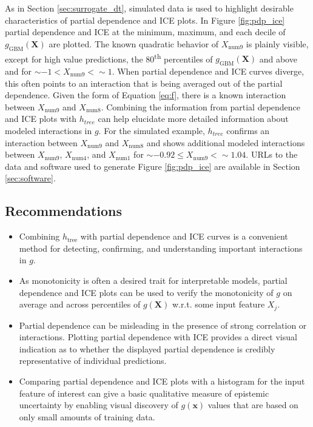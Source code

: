 \documentclass[sigconf, review]{acmart}
\begin{document}
As in Section \ref{sec:surrogate_dt}, simulated data is used to highlight desirable characteristics of partial dependence and ICE plots. In Figure \ref{fig:pdp_ice} partial dependence and ICE at the minimum, maximum, and each decile of $g_{\text{GBM}}(\mathbf{X})$ are plotted. The known quadratic behavior of $X_{\text{num}9}$ is plainly visible, except for high value predictions, the 80\textsuperscript{th} percentiles of $g_{\text{GBM}}(\mathbf{X})$ and above and for $\sim-1 < X_{\text{num}9} < \sim1$. When partial dependence and ICE curves diverge, this often points to an interaction that is being averaged out of the partial dependence. Given the form of Equation \ref{eq:f}, there is a known interaction between $X_{\text{num}9}$ and $X_{\text{num}8}$. Combining the information from partial dependence and ICE plots with $h_{tree}$ can help elucidate more detailed information about modeled interactions in $g$. For the simulated example, $h_{tree}$ confirms an interaction between $X_{\text{num}9}$ and $X_{\text{num}8}$ and shows additional modeled interactions between $X_{\text{num}9}$, $X_{\text{num}4}$, and $X_{\text{num}1}$ for $\sim -0.92 \le X_{\text{num}9} <  \sim 1.04.$ URLs to the data and software used to generate Figure \ref{fig:pdp_ice} are available in Section \ref{sec:software}.

\subsection{Recommendations}

\begin{itemize}

\item Combining $h_{\text{tree}}$ with partial dependence and ICE curves is a convenient method for detecting, confirming, and understanding important interactions in $g$.

\item As monotonicity is often a desired trait for interpretable models, partial dependence and ICE plots can be used to verify the monotonicity of $g$ on average and across percentiles of $g(\mathbf{X})$ w.r.t. some input feature $X_j$.

\item Partial dependence can be misleading in the presence of strong correlation or interactions. Plotting partial dependence with ICE provides a direct visual indication as to whether the displayed partial dependence is credibly representative of individual predictions.

\item Comparing partial dependence and ICE plots with a histogram for the input feature of interest can give a basic qualitative measure of epistemic uncertainty by enabling visual discovery of $g(\mathbf{x})$ values that are based on only small amounts of training data.

\end{itemize}
\end{document}
